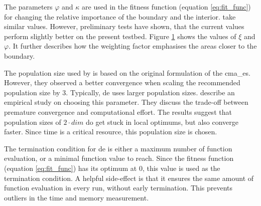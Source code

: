 \documentclass[./\jobname.tex]{subfiles}
\begin{document}
The parameters $\varphi$ and $\kappa$ are used in the fitness function (equation \eqref{eq:fit_func}) for changing the relative importance of the boundary and the interior. \cite{chaquet_using_2019} take similar values. However, preliminary tests have shown, that the current values perform slightly better on the present testbed. Figure \ref{fig:collocation_weight} shows the values of $\xi$ and $\varphi$. It further describes how the weighting factor emphasises the areas closer to the boundary. 

\begin{figure}[h]
	\centering
	\noindent{}
	\label{fig:collocation_weight}
\end{figure}

The population size used by \cite{chaquet_using_2019} is based on the original formulation of the \gls{cma_es}. However, they observed a better convergence when scaling the recommended population size by 3. Typically, \gls{de} uses larger population sizes. \cite{mallipeddi_empirical_2008} describe an empirical study on choosing this parameter. They discuss the trade-off between premature convergence and computational effort. The results suggest that population sizes of $2\cdot dim$ do get stuck in local optimums, but also converge faster. Since time is a critical resource, this population size is chosen. 

The termination condition for \gls{de} is either a maximum number of function evaluation, or a minimal function value to reach. Since the fitness function (equation \eqref{eq:fit_func}) has its optimum at 0, this value is used as the termination condition. A helpful side-effect is that it ensures the same amount of function evaluation in every run, without early termination. This prevents outliers in the time and memory measurement. 
\end{document}
